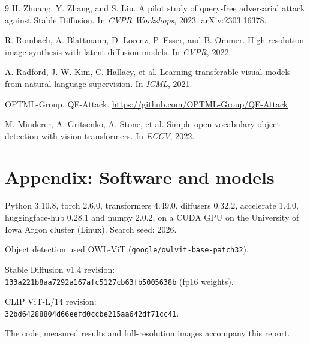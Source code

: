\documentclass[11pt]{article}
\begin{document}
\begin{thebibliography}{9}
H. Zhuang, Y. Zhang, and S. Liu.
A pilot study of query-free adversarial attack against Stable Diffusion.
In \emph{CVPR Workshops}, 2023. arXiv:2303.16378.

R. Rombach, A. Blattmann, D. Lorenz, P. Esser, and B. Ommer.
High-resolution image synthesis with latent diffusion models.
In \emph{CVPR}, 2022.

A. Radford, J. W. Kim, C. Hallacy, et al.
Learning transferable visual models from natural language supervision.
In \emph{ICML}, 2021.

OPTML-Group. QF-Attack.
\url{https://github.com/OPTML-Group/QF-Attack}

M. Minderer, A. Gritsenko, A. Stone, et al.
Simple open-vocabulary object detection with vision transformers.
In \emph{ECCV}, 2022.
\end{thebibliography}

\section*{Appendix: Software and models}
\label{sec:software}

Python 3.10.8, torch 2.6.0, transformers 4.49.0, diffusers 0.32.2, accelerate 1.4.0, huggingface-hub 0.28.1 and numpy 2.0.2, on a CUDA GPU on the University of Iowa Argon cluster (Linux). Search seed: 2026.

Object detection used OWL-ViT (\nolinkurl{google/owlvit-base-patch32}).

Stable Diffusion v1.4 revision:\\
\nolinkurl{133a221b8aa7292a167afc5127cb63fb5005638b} (fp16 weights).

CLIP ViT-L/14 revision:\\
\nolinkurl{32bd64288804d66eefd0ccbe215aa642df71cc41}.

The code, measured results and full-resolution images accompany this report.
\end{document}
